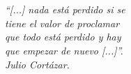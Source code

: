 
\chapter*{}
\begin{flushright}
\textit{“[...] nada está perdido si se\\
tiene el valor de proclamar\\
que todo está perdido y hay\\
que empezar de nuevo [...]”.
\\
		Julio Cortázar.}
\end{flushright}

